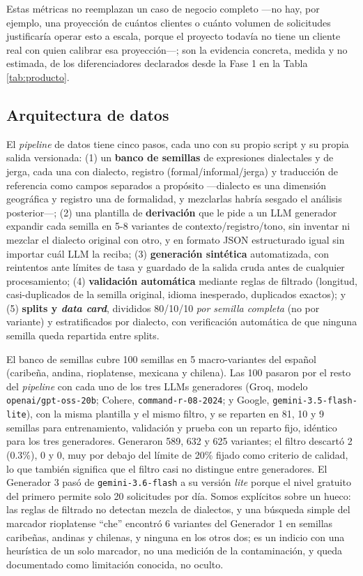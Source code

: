 \documentclass[11pt,a4paper]{article}
\begin{document}
Estas métricas no reemplazan un caso de negocio completo —no hay, por ejemplo, una proyección de cuántos clientes o cuánto volumen de solicitudes justificaría operar esto a escala, porque el proyecto todavía no tiene un cliente real con quien calibrar esa proyección—; son la evidencia concreta, medida y no estimada, de los diferenciadores declarados desde la Fase 1 en la Tabla \ref{tab:producto}.

\subsection{Arquitectura de datos}

El \textit{pipeline} de datos tiene cinco pasos, cada uno con su propio script y su propia salida versionada: (1) un \textbf{banco de semillas} de expresiones dialectales y de jerga, cada una con dialecto, registro (formal/informal/jerga) y traducción de referencia como campos separados a propósito —dialecto es una dimensión geográfica y registro una de formalidad, y mezclarlas habría sesgado el análisis posterior—; (2) una plantilla de \textbf{derivación} que le pide a un LLM generador expandir cada semilla en 5-8 variantes de contexto/registro/tono, sin inventar ni mezclar el dialecto original con otro, y en formato JSON estructurado igual sin importar cuál LLM la reciba; (3) \textbf{generación sintética} automatizada, con reintentos ante límites de tasa y guardado de la salida cruda antes de cualquier procesamiento; (4) \textbf{validación automática} mediante reglas de filtrado (longitud, casi-duplicados de la semilla original, idioma inesperado, duplicados exactos); y (5) \textbf{splits y \textit{data card}}, divididos 80/10/10 \emph{por semilla completa} (no por variante) y estratificados por dialecto, con verificación automática de que ninguna semilla queda repartida entre splits.

El banco de semillas cubre 100 semillas en 5 macro-variantes del español (caribeña, andina, rioplatense, mexicana y chilena). Las 100 pasaron por el resto del \textit{pipeline} con cada uno de los tres LLMs generadores (Groq, modelo \texttt{openai/gpt-oss-20b}; Cohere, \texttt{command-r-08-2024}; y Google, \texttt{gemini-3.5-flash-lite}), con la misma plantilla y el mismo filtro, y se reparten en 81, 10 y 9 semillas para entrenamiento, validación y prueba con un reparto fijo, idéntico para los tres generadores. Generaron 589, 632 y 625 variantes; el filtro descartó 2 (0.3\%), 0 y 0, muy por debajo del límite de 20\% fijado como criterio de calidad, lo que también significa que el filtro casi no distingue entre generadores. El Generador 3 pasó de \texttt{gemini-3.6-flash} a su versión \textit{lite} porque el nivel gratuito del primero permite solo 20 solicitudes por día. Somos explícitos sobre un hueco: las reglas de filtrado no detectan mezcla de dialectos, y una búsqueda simple del marcador rioplatense ``che'' encontró 6 variantes del Generador 1 en semillas caribeñas, andinas y chilenas, y ninguna en los otros dos; es un indicio con una heurística de un solo marcador, no una medición de la contaminación, y queda documentado como limitación conocida, no oculto.
\end{document}
